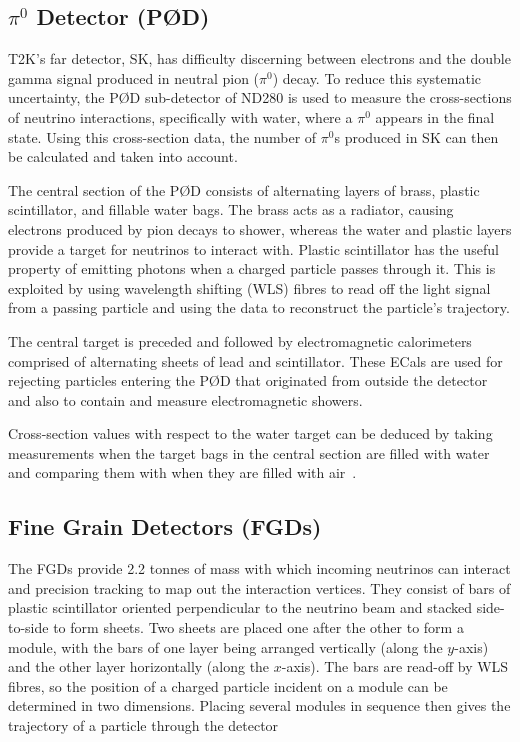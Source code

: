 \documentclass[aps,pra,12pt,notitlepage,tightenlines]{revtex4-1}
\begin{document}
\subsection{\boldmath$\pi^0$ Detector (P\O D)}
T2K's far detector, SK, has difficulty discerning between electrons and the double gamma signal produced in neutral pion ($\pi^0$) decay. To reduce this systematic uncertainty, the P\O D sub-detector of ND280 is used to measure the cross-sections of neutrino interactions, specifically with water, where a $\pi^0$ appears in the final state. Using this cross-section data, the number of $\pi^0$s produced in SK can then be calculated and taken into account. 

The central section of the P\O D consists of alternating layers of brass, plastic scintillator, and fillable water bags. The brass acts as a radiator, causing electrons produced by pion decays to shower, whereas the water and plastic layers provide a target for neutrinos to interact with. Plastic scintillator has the useful property of emitting photons when a charged particle passes through it. This is exploited by using wavelength shifting (WLS) fibres to read off the light signal from a passing particle and using the data to reconstruct the particle's trajectory. 

The central target is preceded and followed by electromagnetic calorimeters comprised of alternating sheets of lead and scintillator. These ECals are used for rejecting particles entering the P\O D that originated from outside the detector and also to contain and measure electromagnetic showers. 

Cross-section values with respect to the water target can be deduced by taking measurements when the target bags in the central section are filled with water and comparing them with when they are filled with air~\cite{ABE2011106, Assylbekov:2011sh}.

\subsection{Fine Grain Detectors (FGDs)}
The FGDs provide 2.2 tonnes of mass with which incoming neutrinos can interact and precision tracking to map out the interaction vertices. They consist of bars of plastic scintillator oriented perpendicular to the neutrino beam and stacked side-to-side to form sheets. Two sheets are placed one after the other to form a module, with the bars of one layer being arranged vertically (along the $y$-axis) and the other layer horizontally (along the $x$-axis). The bars are read-off by WLS fibres, so the position of a charged particle incident on a module can be determined in two dimensions. Placing several modules in sequence then gives the trajectory of a particle through the detector
\end{document}
